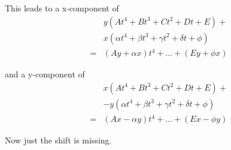 This leads to a x-component of
\begin{eqnarray}
&& y ( At^4 + Bt^3 + Ct^2 + Dt + E ) + \nonumber \\
&& x ( \alpha t^4 + \beta t^3 + \gamma t^2 + \delta t + \phi ) \\
&=& (Ay + \alpha x)t^4 + \ldots + (Ey + \phi x)
\end{eqnarray}

and a y-component of
\begin{eqnarray}
&&  x ( At^4 + Bt^3 + Ct^2 + Dt + E ) + \nonumber \\
&& -y ( \alpha t^4 + \beta t^3 + \gamma t^2 + \delta t + \phi ) \\
&=& (Ax - \alpha y)t^4 + \ldots + (Ex - \phi y)
\end{eqnarray}

Now just the shift is missing.

\clearpage
